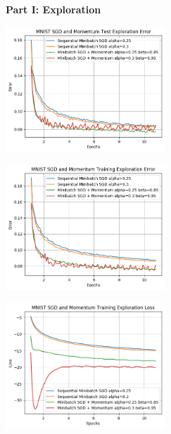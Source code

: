 \documentclass[10pt]{article}
\begin{document}
\begin{multicols}{2}
\textbf{Part I: Exploration}
\begin{center}
    \includegraphics[width=0.45\textwidth]{SGDandMomentumTestExplorationError.png}
\end{center}
\begin{center}
    \includegraphics[width=0.45\textwidth]{SGDandMomentumTrainingExplorationError.png}
\end{center}
\begin{center}
    \includegraphics[width=0.45\textwidth]{SGDandMomentumTrainingExplorationLoss.png}
\end{center}
\end{multicols}
\end{document}
